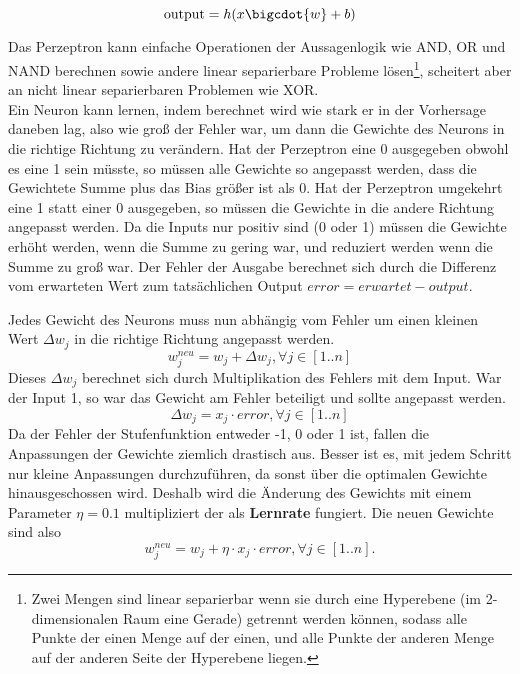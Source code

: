 \begin{equation}
	\textrm{output} = h(x\bigcdot{w}+b)
\end{equation}

Das Perzeptron kann einfache Operationen der Aussagenlogik wie AND, OR und NAND berechnen sowie andere linear separierbare Probleme lösen\footnote{Zwei Mengen sind linear separierbar wenn sie durch eine Hyperebene (im 2-dimensionalen Raum eine Gerade) getrennt werden können, sodass alle Punkte der einen Menge auf der einen, und alle Punkte der anderen Menge auf der anderen Seite der Hyperebene liegen.}, scheitert aber an nicht linear separierbaren Problemen wie XOR.\\

Ein Neuron kann lernen, indem berechnet wird wie stark er in der Vorhersage daneben lag, also wie groß der Fehler war, um dann die Gewichte des Neurons in die richtige Richtung zu verändern. Hat der Perzeptron eine 0 ausgegeben obwohl es eine 1 sein müsste, so müssen alle Gewichte so angepasst werden, dass die Gewichtete Summe plus das Bias größer ist als 0. Hat der Perzeptron umgekehrt eine 1 statt einer 0 ausgegeben, so müssen die Gewichte in die andere Richtung angepasst werden. Da die Inputs nur positiv sind (0 oder 1) müssen die Gewichte erhöht werden, wenn die Summe zu gering war, und reduziert werden wenn die Summe zu groß war. Der Fehler der Ausgabe berechnet sich durch die Differenz vom erwarteten Wert zum tatsächlichen Output $error = erwartet - output$.

Jedes Gewicht des Neurons muss nun abhängig vom Fehler um einen kleinen Wert $\Delta w_j$  in die richtige Richtung angepasst werden. 
\begin{equation}
w_{j}^{neu} = w_j + \Delta w_j, \forall j \in [1 .. n]
\end{equation}
Dieses $\Delta w_j$ berechnet sich durch Multiplikation des Fehlers mit dem Input. War der Input 1, so war das Gewicht am Fehler beteiligt und sollte angepasst werden.
\begin{equation}
\Delta w_j = x_j \cdot error , \forall j \in [1 .. n]
\end{equation}
Da der Fehler der Stufenfunktion entweder -1, 0 oder 1 ist, fallen die Anpassungen der Gewichte ziemlich drastisch aus. Besser ist es, mit jedem Schritt nur kleine Anpassungen durchzuführen, da sonst über die optimalen Gewichte hinausgeschossen wird. Deshalb wird die Änderung des Gewichts mit einem Parameter $\eta = 0.1$ multipliziert der als \textbf{Lernrate} fungiert.
Die neuen Gewichte sind also
\begin{equation}
w_{j}^{neu} = w_j + \eta \cdot x_j \cdot error, \forall j \in [1 .. n].
\end{equation}

